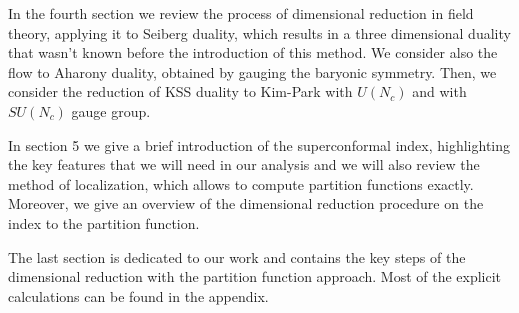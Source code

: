In the fourth section we review the process of dimensional reduction in field theory, applying it to Seiberg duality, which results in a three dimensional duality that wasn't known before the introduction of this method. 
We  consider also the flow to Aharony duality, obtained by gauging the baryonic symmetry.
Then, we consider the reduction of KSS duality to Kim-Park with $U(N_c)$ and with $SU(N_c)$ gauge group.

In section 5 we give a brief introduction of the superconformal index, highlighting the key features that we will need in our analysis and we will also review the method of localization, which allows to compute partition functions exactly.
Moreover, we give an overview of the dimensional reduction procedure on the index to the partition function.

The last section is dedicated to our work and contains the key steps of the dimensional reduction with the partition function approach. 
Most of the explicit calculations can be found in the appendix.



